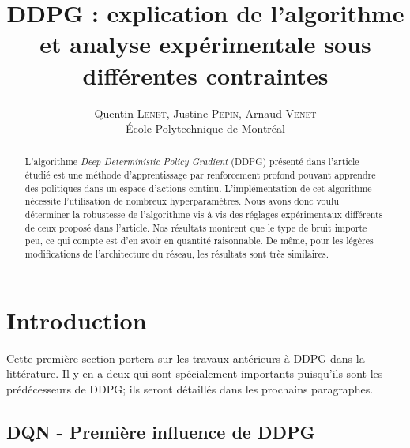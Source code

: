 \documentclass[letterpaper, french]{article}
\title{DDPG : explication de l'algorithme et analyse expérimentale sous différentes contraintes}
\author {Quentin \textsc{Lenet}, Justine \textsc{Pepin}, Arnaud \textsc{Venet} \\
École Polytechnique de Montréal }
\begin{document}
 
\maketitle 
\begin{abstract} 
L'algorithme \textit{Deep Deterministic Policy Gradient} (DDPG) présenté dans l'article étudié \cite{ddpg} est une méthode d'apprentissage par renforcement profond pouvant apprendre des politiques dans un espace d'actions continu. L'implémentation de cet algorithme nécessite l'utilisation de nombreux hyperparamètres. Nous avons donc voulu déterminer la robustesse de l'algorithme vis-à-vis des réglages expérimentaux différents de ceux proposé dans l'article. Nos résultats montrent que le type de bruit importe peu, ce qui compte est d'en avoir en quantité raisonnable. De même, pour les légères modifications de l'architecture du réseau, les résultats sont très similaires.

\end{abstract} 


\section{Introduction}
Cette première section portera sur les travaux antérieurs à DDPG dans la littérature. Il y en a deux qui sont spécialement importants puisqu'ils sont les prédécesseurs de DDPG; ils seront détaillés dans les prochains paragraphes.
\subsection{DQN - Première influence de DDPG}
\end{document}
